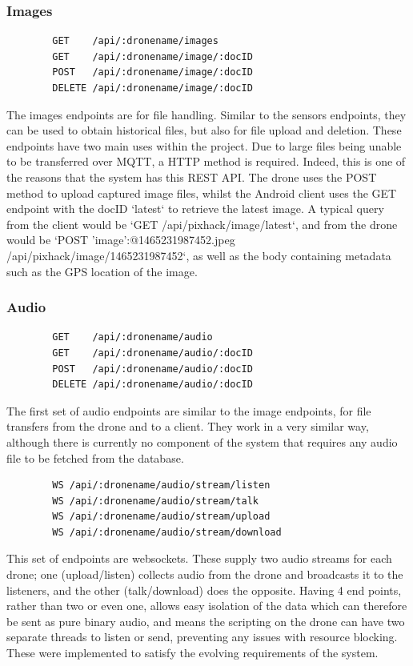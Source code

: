 \documentclass{article}
\begin{document}
\subsubsection{Images}
\begin{center}
	\begin{lstlisting}
		GET    /api/:dronename/images
		GET    /api/:dronename/image/:docID
		POST   /api/:dronename/image/:docID
		DELETE /api/:dronename/image/:docID
	\end{lstlisting}
\end{center}
The images endpoints are for file handling. Similar to the sensors endpoints, they can be used to obtain historical files, but also for file upload and deletion. These endpoints have two main uses within the project. Due to large files being unable to be transferred over MQTT, a HTTP method is required. Indeed, this is one of the reasons that the system has this REST API. The drone uses the POST method to upload captured image files, whilst the Android client uses the GET endpoint with the docID `latest` to retrieve the latest image. A typical query from the client would be `GET /api/pixhack/image/latest`, and from the drone would be `POST {'image':@1465231987452.jpeg} /api/pixhack/image/1465231987452`, as well as the body containing metadata such as the GPS location of the image. 

\subsubsection{Audio}
\begin{center}
	\begin{lstlisting}
		GET    /api/:dronename/audio
		GET    /api/:dronename/audio/:docID
		POST   /api/:dronename/audio/:docID
		DELETE /api/:dronename/audio/:docID
	\end{lstlisting}
\end{center}
The first set of audio endpoints are similar to the image endpoints, for file transfers from the drone and to a client. They work in a very similar way, although there is currently no component of the system that requires any audio file to be fetched from the database. 
\begin{center}	
	\begin{lstlisting}
		WS /api/:dronename/audio/stream/listen
		WS /api/:dronename/audio/stream/talk
		WS /api/:dronename/audio/stream/upload
		WS /api/:dronename/audio/stream/download
	\end{lstlisting}
\end{center}
This set of endpoints are websockets. These supply two audio streams for each drone; one (upload/listen) collects audio from the drone and broadcasts it to the listeners, and the other (talk/download) does the opposite. Having 4 end points, rather than two or even one, allows easy isolation of the data which can therefore be sent as pure binary audio, and means the scripting on the drone can have two separate threads to listen or send, preventing any issues with resource blocking. These were implemented to satisfy the evolving requirements of the system. 
\end{document}
